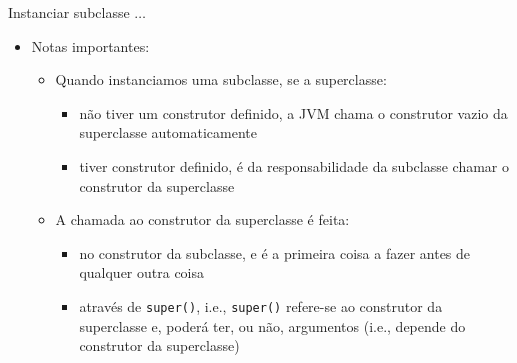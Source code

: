 \documentclass[portuguese, aspectratio=169, xcolor=table]{beamer}
\begin{document}
\begin{frame}{Instanciar subclasse $\ldots$}
\begin{itemize}
    \item Notas importantes:
    \begin{itemize}
        \item Quando instanciamos uma subclasse, se a superclasse:
        \begin{itemize}
            \item não tiver um construtor definido, a JVM chama o construtor vazio da superclasse automaticamente
            \item tiver construtor definido, é da responsabilidade da subclasse chamar o construtor da superclasse 
        \end{itemize}
    \item A chamada ao construtor da superclasse é feita:
    \begin{itemize}
        \item  no construtor da subclasse, e é a primeira coisa a fazer antes de qualquer outra coisa
        \item através de \texttt{super()}, i.e., \texttt{super()} refere-se ao construtor da superclasse e, poderá ter, ou não, argumentos (i.e., depende do construtor da superclasse)
    \end{itemize}
    \end{itemize}
\end{itemize}
\end{frame}
\end{document}
